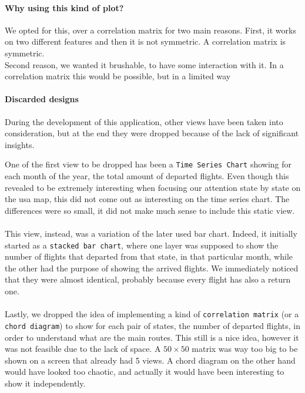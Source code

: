\documentclass[a4paper, 12pt]{article}
\begin{document}
\paragraph{Why using this kind of plot?}
We opted for this, over a correlation matrix for two main reasons. First, it works on two different
features and then it is not symmetric. A correlation matrix is symmetric.
\\
Second reason, we wanted it brushable, to have some interaction with it. In a correlation matrix this
would be possible, but in a limited way

\paragraph{Discarded designs}
During the development of this application, other views have been taken into consideration, but at the end they were dropped because of the lack of significant insights.

One of the first view to be dropped has been a \texttt{Time Series Chart} showing for each month of the year, the total amount of departed flights. Even though this revealed to be extremely interesting when focusing our attention state by state on the usa map, this did not come out as interesting on the time series chart. The differences were so small, it did not make much sense to include this static view.\\ \\
This view, instead, was a variation of the later used bar chart. Indeed, it initially started as a \texttt{stacked bar chart}, where one layer was supposed to show the number of flights that departed from that state, in that particular month, while the other had the purpose of showing the arrived flights. We immediately noticed that they were almost identical, probably because every flight has also a return one.\\ \\
Lastly, we dropped the idea of implementing a kind of \texttt{correlation matrix} (or a \texttt{chord diagram}) to show for each pair of states, the number of departed flights, in order to understand what are the main routes. This still is a nice idea, however it was not feasible due to the lack of space. A $50\times50$ matrix was way too big to be shown on a screen that already had 5 views. A chord diagram on the other hand would have looked too chaotic, and actually it would have been interesting to show it independently.

\clearpage
\end{document}
